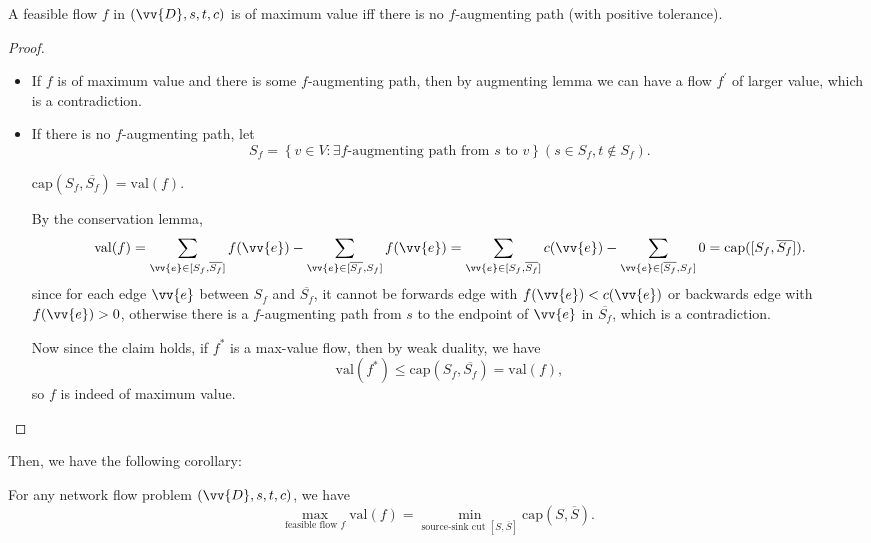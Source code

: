 \begin{lemma}
    A feasible flow \(f\) in \((\vv{D}, s, t, c)\) is of maximum value iff there is no \(f\)-augmenting path (with positive tolerance).   
\end{lemma}

\begin{proof}
    \hfill 
    \begin{itemize}
        \item [\((\implies )\)] If \(f\) is of maximum value and there is some \(f\)-augmenting path, then by augmenting lemma we can have a flow \(f^{\prime}\) of larger value, which is a contradiction. 
        \item [\((\impliedby)\)] If there is no \(f\)-augmenting path, let
        \[
            S_f = \left\{ v \in V: \exists f\text{-augmenting path from } s \text{ to } v   \right\} (s \in S_f, t \notin S_f).
        \]
        \begin{claim}
            \(\mathrm{cap}(S_f, \overline{S_f} ) = \mathrm{val}(f) \). 
        \end{claim}
        \begin{explanation}
            By the conservation lemma, 
            \[
                \mathrm{val}(f) = \sum_{\vv{e} \in [S_f, \overline{S_f}]} f(\vv{e}) - \sum_{\vv{e} \in [\overline{S_f}, S_f ]} f(\vv{e}) = \sum_{\vv{e} \in [S_f, \overline{S_f} ]} c(\vv{e}) - \sum_{\vv{e} \in [\overline{S_f} , S_f]} 0 = \mathrm{cap}([S_f, \overline{S_f}]).  
            \]
            since for each edge \(\vv{e}\) between \(S_f\) and \(\overline{S_f}\), it cannot be forwards edge with \(f(\vv{e}) < c(\vv{e})\) or backwards edge with \(f(\vv{e}) > 0\), otherwise there is a \(f\)-augmenting path from \(s\) to the endpoint of \(\vv{e}\) in \(\overline{S_f}\), which is a contradiction.        
        \end{explanation}

        Now since the claim holds, if \(f^*\) is a max-value flow, then by weak duality, we have
        \[
            \mathrm{val}(f^*) \le \mathrm{cap}(S_f, \overline{S_f}) = \mathrm{val}(f), 
        \] 
        so \(f\) is indeed of maximum value. 
    \end{itemize}
\end{proof}

Then, we have the following corollary:
\begin{theorem}
    For any network flow problem \((\vv{D}, s, t, c)\), we have 
    \[
        \max _{\text{feasible flow } f} \mathrm{val}(f) = \min_{\text{source-sink cut } [S, \overline{S}] } \mathrm{cap}(S, \overline{S}).  
    \] 
\end{theorem}

